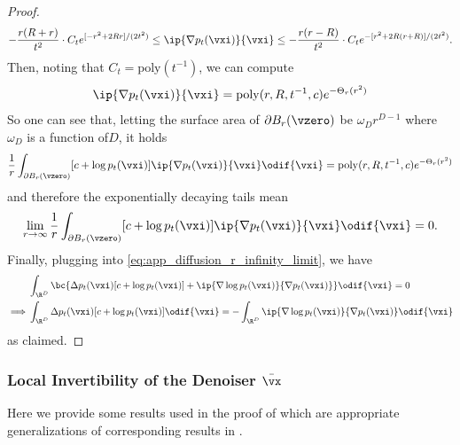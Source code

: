 \documentclass[../../book-main.tex]{subfiles}
\begin{document}
\begin{proof}
    \begin{equation}
        -\frac{r(R + r)}{t^{2}}\cdot C_{t}e^{[-r^{2} + 2Rr]/(2t^{2})} \leq \ip{\nabla p_{t}(\vxi)}{\vxi} \leq -\frac{r(r - R)}{t^{2}}\cdot C_{t}e^{-[r^{2} + 2R(r + R)]/(2t^{2})}.
    \end{equation}
    Then, noting that \(C_{t} = \mathrm{poly}(t^{-1})\), we can compute 
    \begin{equation}
        [c + \log p_{t}(\vxi)]\ip{\nabla p_{t}(\vxi)}{\vxi} = \mathrm{poly}(r, R, t^{-1}, c)e^{-\Theta_{r}(r^{2})}
    \end{equation}
    So one can see that, letting the surface area of \(\partial B_{r}(\vzero)\) be \(\omega_{D} r^{D - 1}\) where \(\omega_{D}\) is a function of\(D\), it holds
    \begin{equation}
        \frac{1}{r}\int_{\partial B_{r}(\vzero)}[c + \log p_{t}(\vxi)]\ip{\nabla p_{t}(\vxi)}{\vxi}\odif{\vxi} = \mathrm{poly}(r, R, t^{-1}, c)e^{-\Theta_{r}(r^{2})}
    \end{equation}
    and therefore the exponentially decaying tails mean
    \begin{equation}
        \lim_{r \to \infty}\frac{1}{r}\int_{\partial B_{r}(\vzero)}[c + \log p_{t}(\vxi)]\ip{\nabla p_{t}(\vxi)}{\vxi}\odif{\vxi} = 0.
    \end{equation}
    Finally, plugging into \eqref{eq:app_diffusion_r_infinity_limit}, we have
    \begin{align}
        &\int_{\R^{D}}\bc{\Delta p_{t}(\vxi)[c + \log p_{t}(\vxi)] + \ip{\nabla \log p_{t}(\vxi)}{\nabla p_{t}(\vxi)}}\odif{\vxi} = 0 \\
        \implies 
        &\int_{\R^{D}}\Delta p_{t}(\vxi)[c + \log p_{t}(\vxi)]\odif{\vxi} = -\int_{\R^{D}}\ip{\nabla \log p_{t}(\vxi)}{\nabla p_{t}(\vxi)}\odif{\vxi}
    \end{align}
    as claimed.
\end{proof}

\subsubsection{Local Invertibility of the Denoiser \(\bar{\vx}\)}

Here we provide some results used in the proof of  which are appropriate generalizations of corresponding results in \cite{Gribonval2011-pf}.
\end{document}
